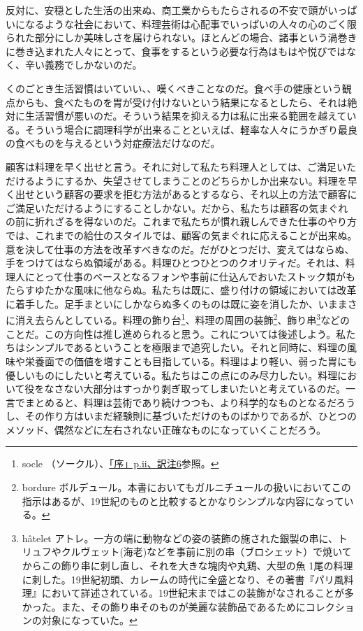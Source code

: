 \begin{main}
反対に、安穏とした生活の出来ぬ、商工業からもたらされるの不安で頭がいっぱいになるような社会において、料理芸術は心配事でいっぱいの人々の心のごく限られた部分にしか美味しさを届けられない。ほとんどの場合、諸事という渦巻きに巻き込まれた人々にとって、食事をするという必要な行為はもはや悦びではなく、辛い義務でしかないのだ。

くのごとき生活習慣はいていい、、嘆くべきことなのだ。食べ手の健康という観点からも、食べたものを胃が受け付けないという結果になるとしたら、それは絶対に生活習慣が悪いのだ。そういう結果を抑える力は私に出来る範囲を越えている。そういう場合に調理科学が出来ることといえば、軽率な人々にうかぎり最良の食べものを与えるという対症療法だけなのだ。

顧客は料理を早く出せと言う。それに対して私たち料理人としては、ご満足いただけるようにするか、失望させてしまうことのどちらかしか出来ない。料理を早く出せという顧客の要求を拒む方法があるとするなら、それ以上の方法で顧客にご満足いただけるようにすることしかない。だから、私たちは顧客の気まぐれの前に折れざるを得ないのだ。これまで私たちが慣れ親しんできた仕事のやり方では、これまでの給仕のスタイルでは、顧客の気まぐれに応えることが出来ぬ。意を決して仕事の方法を改革すべきなのだ。だがひとつだけ、変えてはならぬ、手をつけてはならぬ領域がある。料理ひとつひとつのクオリティだ。それは、料理人にとって仕事のベースとなるフォンや事前に仕込んでおいたストック類がもたらすゆたかな風味に他ならぬ。私たちは既に、盛り付けの領域においては改革に着手した。足手まといにしかならぬ多くのものは既に姿を消したか、いままさに消え去らんとしている。料理の飾り台\footnote{socle
  （ソークル）、\protect\hyperlink{socle}{「序」p.ii、訳注6}参照。}、料理の周囲の装飾\footnote{bordure
  ボルデュール。本書においてもガルニチュールの扱いにおいてこの指示はあるが、19世紀のものと比較するとかなりシンプルな内容になっている。}、飾り串\footnote{hâtelet
  アトレ。一方の端に動物などの姿の装飾の施された銀製の串に、トリュフやクルヴェット(海老)などを事前に別の串（ブロシェット）で焼いてからこの飾り串に刺し直し、それを大きな塊肉や丸鶏、大型の魚
  1尾の料理に刺した。19世紀初頭、カレームの時代に全盛となり、その著書『パリ風料理』において詳述されている。19世紀末まではこの装飾がなされることが多かった。また、その飾り串そのものが美麗な装飾品であるためにコレクションの対象になっていた。}などのことだ。この方向性は推し進められると思う。これについては後述しよう。私たちはシンプルであるということを極限まで追究したい。それと同時に、料理の風味や栄養面での価値を増すことも目指している。料理はより軽い、弱った胃にも優しいものにしたいと考えている。私たちはこの点にのみ尽力したい。料理において役をなさない大部分はすっかり剥ぎ取ってしまいたいと考えているのだ。一言でまとめると、料理は芸術であり続けつつも、より科学的なものとなるだろうし、その作り方はいまだ経験則に基づいただけのものばかりであるが、ひとつのメソッド、偶然などに左右されない正確なものになっていくことだろう。


\end{main}
